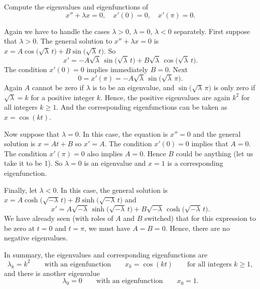 \begin{example}
Compute the 
 eigenvalues and eigenfunctions of
\begin{equation*}
x'' + \lambda x = 0, \quad x'(0) = 0, \quad x'(\pi) = 0 .
\end{equation*}

Again we have to handle the cases $\lambda > 0$, $\lambda = 0$, $\lambda
< 0$ separately.
First suppose that $\lambda > 0$.
The general solution to $x''+\lambda x = 0$ is
$x = A \cos \bigl( \sqrt{\lambda}\, t\bigr) + B \sin \bigl( \sqrt{\lambda}\,
t\bigr)$.
So
\begin{equation*}
x' = -A\sqrt{\lambda}\, \sin \bigl( \sqrt{\lambda}\, t\bigr) +
B\sqrt{\lambda}\, \cos \bigl(\sqrt{\lambda}\, t\bigr) .
\end{equation*}
The condition $x'(0) = 0$ implies immediately $B = 0$.
Next
\begin{equation*}
0 = x'(\pi) = -A\sqrt{\lambda}\, \sin \bigl( \sqrt{\lambda}\, \pi\bigr) .
\end{equation*}
Again $A$ cannot be zero if $\lambda$ is to be an eigenvalue,
and $\sin \bigl( \sqrt{\lambda}\, \pi\bigr)$ is only zero
if
$\sqrt{\lambda} = k$ for a positive integer $k$.
Hence, the positive eigenvalues are again
$k^2$ for all integers $k \geq 1$.  And the corresponding eigenfunctions
can be taken as $x=\cos (k t)$.

Now suppose that $\lambda = 0$.  In this case, the equation is $x'' = 0$
and the general solution is $x = At + B$ so $x' = A$.  The condition
$x'(0) = 0$ implies that
$A=0$.  The condition $x'(\pi) = 0$ also implies $A=0$.
Hence $B$ could be anything (let us take it to be 1).  So $\lambda = 0$
is an eigenvalue and $x=1$ is a corresponding eigenfunction.

Finally, let $\lambda < 0$.  In this case, the general solution is
$x = A \cosh \bigl( \sqrt{-\lambda}\, t\bigr)
+ B \sinh \bigl( \sqrt{-\lambda}\, t\bigr)$
and
\begin{equation*}
x' = A\sqrt{-\lambda}\, \sinh \bigl( \sqrt{-\lambda}\, t\bigr)
+ B\sqrt{-\lambda}\, \cosh \bigl( \sqrt{-\lambda}\, t \bigr) .
\end{equation*}
We have already seen (with roles of $A$ and $B$ switched) that for this
expression to be zero at $t=0$ and $t=\pi$, we must have $A=B=0$.
Hence, there are
no negative eigenvalues.

In summary, the eigenvalues and corresponding eigenfunctions are
\begin{equation*}
\lambda_k = k^2 \qquad \text{with an eigenfunction} \qquad x_k = \cos (k t)
\qquad \text{for all integers } k \geq 1 ,
\end{equation*}
and there is another eigenvalue
\begin{equation*}
\lambda_0 = 0 \qquad \text{with an eigenfunction} \qquad x_0 = 1.
\end{equation*}
\end{example}

